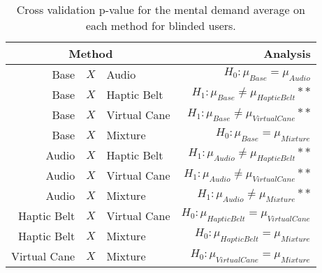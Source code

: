 
\begin{table}[!htb]
\centering
\caption{Cross validation p-value for the mental demand average on each method for blinded users.}
\label{tab:lsd_mental_demand_avg}
\begin{tabular}{rclr}
\toprule
      \multicolumn{3}{c}{Method} &                                       Analysis \\
\midrule
              Base & $X$ & Audio &               $H_0 : \mu_{Base} = \mu_{Audio}$ \\
        Base & $X$ & Haptic Belt &     $H_1 : \mu_{Base} \ne \mu_{Haptic Belt}**$ \\
       Base & $X$ & Virtual Cane &    $H_1 : \mu_{Base} \ne \mu_{Virtual Cane}**$ \\
            Base & $X$ & Mixture &             $H_0 : \mu_{Base} = \mu_{Mixture}$ \\
       Audio & $X$ & Haptic Belt &    $H_1 : \mu_{Audio} \ne \mu_{Haptic Belt}**$ \\
      Audio & $X$ & Virtual Cane &   $H_1 : \mu_{Audio} \ne \mu_{Virtual Cane}**$ \\
           Audio & $X$ & Mixture &        $H_1 : \mu_{Audio} \ne \mu_{Mixture}**$ \\
Haptic Belt & $X$ & Virtual Cane & $H_0 : \mu_{Haptic Belt} = \mu_{Virtual Cane}$ \\
     Haptic Belt & $X$ & Mixture &      $H_0 : \mu_{Haptic Belt} = \mu_{Mixture}$ \\
    Virtual Cane & $X$ & Mixture &     $H_0 : \mu_{Virtual Cane} = \mu_{Mixture}$ \\
\bottomrule
\end{tabular}
\end{table}

